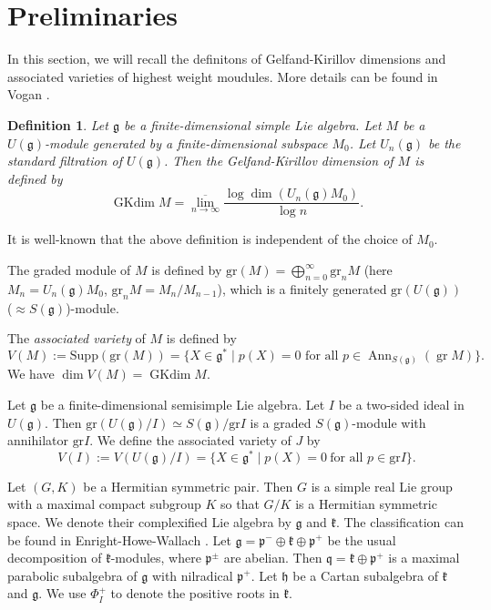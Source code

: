 \documentclass{amsart}[12pt]
\newtheorem{definition}{Definition}[section]
\newcommand{\gkd}{\operatorname{GKdim}}
\numberwithin{equation}{section}
\begin{document}
\section{Preliminaries}

In this section, we will recall the definitons of Gelfand-Kirillov dimensions and associated varieties of highest weight moudules. More details can be found in Vogan \cite{Vo78}.

\begin{definition} Let $\mathfrak{g}$ be a finite-dimensional simple Lie algebra. Let $M$ be a $U(\mathfrak{g})$-module generated by a finite-dimensional subspace $M_0$. Let $U_{n}(\mathfrak{g})$ be the standard filtration of $U(\mathfrak{g})$.  Then the \textit{Gelfand-Kirillov dimension} of $M$  is defined by$$
	\operatorname{GKdim} M = \overline{\lim\limits_{n\rightarrow \infty}}\frac{\log\dim( U_n(\mathfrak{g})M_{0} )}{\log n}.
	$$
\end{definition}
It is well-known that the above definition  is independent of  the choice of  $M_0$.

The graded module of $M$ is defined by $\text{gr} (M)=\bigoplus\limits_{n=0}^{\infty} \text{gr}_n M$ (here $M_n=U_n(\mathfrak{g})M_0$, $\text{gr}_n M=M_n/{M_{n-1}}$), which is a finitely generated $\text{gr}(U(\mathfrak{g}))$($\approx S(\mathfrak{g})$)-module.

The  \textit{ associated variety} of $M$ is defined by
$$
V(M):=\text{Supp}(\text{gr} (M))=\{X\in \mathfrak{g}^* \mid p(X)=0 \text{ for all~} p\in \operatorname{Ann}_{S(\mathfrak{g})}(\operatorname{gr} M)\}.
$$
We have $\dim V(M)=\gkd M$.


Let $\mathfrak{g}$ be a finite-dimensional semisimple Lie algebra. Let $I$ be a two-sided ideal in $U(\mathfrak{g})$. Then $\text{gr}(U(\mathfrak{g})/I)\simeq S(\mathfrak{g})/\text{gr}I$ is a graded $S(\mathfrak{g})$-module with annihilator $\text{gr}I$. We define the associated variety of $J$ by
$$V(I):=V(U(\mathfrak{g})/I)=\{X\in \mathfrak{g}^* \mid p(X)=0\ \mbox{for all $p \in {\text{gr}}I$}\}.
$$




Let $(G,K)$ be a Hermitian symmetric pair. Then $G$ is a simple real Lie group with a maximal compact subgroup $K$ so that $G/K$ is a Hermitian symmetric space. We denote their complexified Lie algebra by $\mathfrak{g}$ and $\mathfrak{k}$. The classification can be found in Enright-Howe-Wallach \cite{EHW}.  Let $\mathfrak{g} =\mathfrak{p}^-\oplus\mathfrak{k}\oplus\mathfrak{p}^+$ be the usual decomposition of $\mathfrak{k}$-modules, where $\mathfrak{p}^\pm$ are abelian. Then $\mathfrak{q}=\mathfrak{k}\oplus\mathfrak{p}^+$ is a maximal parabolic subalgebra of $\mathfrak{g}$ with nilradical $\mathfrak{p}^+$. Let $\mathfrak{h}$ be a Cartan subalgebra of $\mathfrak{k}$ and $\mathfrak{g}$. We use $\Phi_I^+$ to denote the positive roots in $\mathfrak{k}$.
\end{document}
